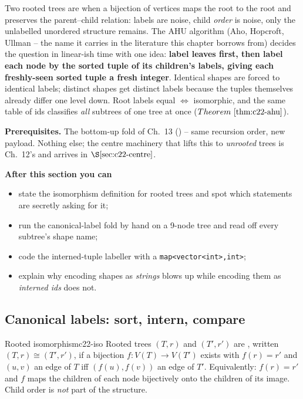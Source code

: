 \begin{topicintro}
Two rooted trees are  when a bijection of vertices maps the
root to the root and preserves the parent--child relation: labels are noise,
child \emph{order} is noise, only the unlabelled unordered structure remains.
The AHU algorithm (Aho, Hopcroft, Ullman -- the name it carries in the
literature this chapter borrows from) decides the question in linear-ish time
with one idea: \textbf{label leaves first, then label each node by the sorted
tuple of its children's labels, giving each freshly-seen sorted tuple a fresh
integer}.  Identical shapes are forced to identical labels; distinct shapes get
distinct labels because the tuples themselves already differ one level down.
Root labels equal \(\iff\) isomorphic, and the same table of ids classifies
\emph{all} subtrees of one tree at once (\(\thmref{c22-ahu}\)).

\textbf{Prerequisites.} The bottom-up fold of Ch.~13 () -- same
recursion order, new payload.  Nothing else; the centre machinery that lifts
this to \emph{unrooted} trees is Ch.~12's and arrives in \(\secref{c22-centre}\).

\textbf{After this section you can}
\begin{itemize}[nosep]
  \item state the isomorphism definition for rooted trees and spot which statements are secretly asking for it; \hfill{}
  \item run the canonical-label fold by hand on a 9-node tree and read off every subtree's shape name; \hfill{}
  \item code the interned-tuple labeller with a \texttt{map<vector<int>,int>}; \hfill{}
  \item explain why encoding shapes as \emph{strings} blows up while encoding them as \emph{interned ids} does not. \hfill{}
\end{itemize}
\end{topicintro}

\subsection{Canonical labels: sort, intern, compare}

\begin{definition}{Rooted isomorphism}{c22-iso}
Rooted trees \((T,r)\) and \((T',r')\) are , written
\((T,r)\cong(T',r')\), if a bijection \(f:V(T)\to V(T')\) exists with
\(f(r)=r'\) and \((u,v)\) an edge of \(T\) iff \((f(u),f(v))\) an edge of \(T'\).
Equivalently: \(f(r)=r'\) and \(f\) maps the children of each node bijectively
onto the children of its image.  Child order is \emph{not} part of the structure.
\end{definition}

